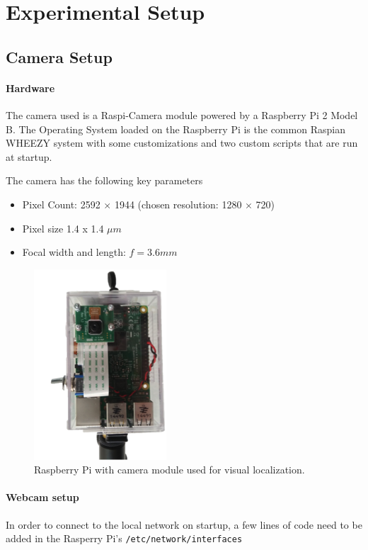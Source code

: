 \newpage
\section{Experimental Setup}

\subsection{Camera Setup}

\paragraph{Hardware} The camera used is a Raspi-Camera module powered by a Raspberry Pi 2 Model B.
The Operating System loaded on the Raspberry Pi is the common Raspian WHEEZY system with some customizations and two custom scripts that are run at startup. 

The camera has the following key parameters \cite{RaspiDoc}
\begin{itemize}
    \item Pixel Count: 2592 $\times$ 1944 (chosen resolution: 1280 $\times$ 720)
    \item Pixel size 1.4 x 1.4 $\mu m$
    \item Focal width and length: $f=3.6mm$
\end{itemize}

\begin{figure}
    \centering
    \includegraphics[width=0.25\linewidth]{files/RaspiCam.png}
    \caption{Raspberry Pi with camera module used for visual localization.}
    \label{fig:camera}
\end{figure}


\paragraph{Webcam setup} In order to connect to the local network on startup, a few lines of code need to be added in the Rasperry Pi's \texttt{/etc/network/interfaces} 


